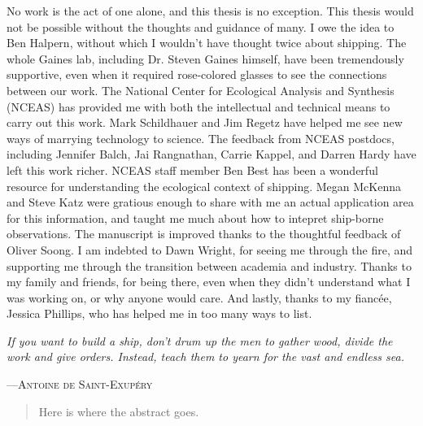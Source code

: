   \approvalpage 
  \copyrightpage


  \begin{acknowledgements}

    No work is the act of one alone, and this thesis is no exception. This thesis would not be possible without the thoughts and guidance of many. I owe the idea to Ben Halpern, without which I wouldn't have thought twice about shipping. The whole Gaines lab, including Dr. Steven Gaines himself, have been tremendously supportive, even when it required rose-colored glasses to see the connections between our work. The National Center for Ecological Analysis and Synthesis (NCEAS) has provided me with both the intellectual and technical means to carry out this work. Mark Schildhauer and Jim Regetz have helped me see new ways of marrying technology to science. The feedback from NCEAS postdocs, including Jennifer Balch, Jai Rangnathan, Carrie Kappel, and Darren Hardy have left this work richer. NCEAS staff member Ben Best has been a wonderful resource for understanding the ecological context of shipping. Megan McKenna and Steve Katz were gratious enough to share with me an actual application area for this information, and taught me much about how to intepret ship-borne observations. The manuscript is improved thanks to the thoughtful feedback of Oliver Soong. I am indebted to Dawn Wright, for seeing me through the fire, and supporting me through the transition between academia and industry. Thanks to my family and friends, for being there, even when they didn't understand what I was working on, or why anyone would care. And lastly, thanks to my fiancée, Jessica Phillips, who has helped me in too many ways to list.

    \setlength{\epigraphwidth}{.9\textwidth}
    \setlength{\epigraphrule}{0pt}
    \epigraph{\textit{If you want to build a ship, don't drum up the men to gather wood, divide the work and give orders. Instead, teach them to yearn for the vast and endless sea.}}
             {---\textsc{Antoine de Saint-Exupéry}}


  \end{acknowledgements}
\ssp

\dsp


  \begin{abstract}
    Here is where the abstract goes.
  \end{abstract}



